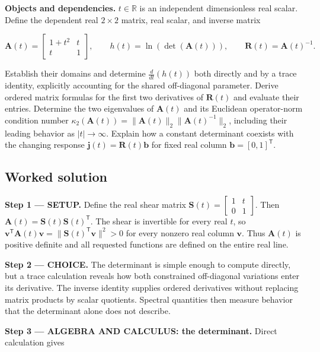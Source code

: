 \documentclass[11pt,oneside,openany]{book}
\begin{document}
\textbf{Objects and dependencies.} \(t\in\mathbb R\) is an independent dimensionless real scalar. Define the dependent real \(2\times2\) matrix, real scalar, and inverse matrix

\[
\mathbf A(t)=\begin{bmatrix}1+t^2&t\\t&1\end{bmatrix},\qquad
h(t)=\ln(\det(\mathbf A(t))),\qquad
\mathbf R(t)=\mathbf A(t)^{-1}.
\]

Establish their domains and determine \(\frac{d}{dt}(h(t))\) both directly and by a trace identity, explicitly accounting for the shared off-diagonal parameter. Derive ordered matrix formulas for the first two derivatives of \(\mathbf R(t)\) and evaluate their entries. Determine the two eigenvalues of \(\mathbf A(t)\) and its Euclidean operator-norm condition number \(\kappa_2(\mathbf A(t))=\|\mathbf A(t)\|_2\|\mathbf A(t)^{-1}\|_2\), including their leading behavior as \(|t|\to\infty\). Explain how a constant determinant coexists with the changing response \(\mathbf j(t)=\mathbf R(t)\mathbf b\) for fixed real column \(\mathbf b=[0,1]^{\mathsf T}\).
\subsection*{Worked solution}

\textbf{Step 1 --- SETUP.} Define the real shear matrix \(\mathbf S(t)=\begin{bmatrix}1&t\\0&1\end{bmatrix}\). Then \(\mathbf A(t)=\mathbf S(t)\mathbf S(t)^{\mathsf T}\). The shear is invertible for every real \(t\), so \(\mathbf v^{\mathsf T}\mathbf A(t)\mathbf v=\|\mathbf S(t)^{\mathsf T}\mathbf v\|^2>0\) for every nonzero real column \(\mathbf v\). Thus \(\mathbf A(t)\) is positive definite and all requested functions are defined on the entire real line.

\begin{ChoiceStep}
\textbf{Step 2 --- CHOICE.} The determinant is simple enough to compute directly, but a trace calculation reveals how both constrained off-diagonal variations enter its derivative. The inverse identity supplies ordered derivatives without replacing matrix products by scalar quotients. Spectral quantities then measure behavior that the determinant alone does not describe.

\end{ChoiceStep}
\begingroup\color{AlgebraBlue}
\textbf{Step 3 --- ALGEBRA AND CALCULUS: the determinant.} Direct calculation gives
\end{document}
